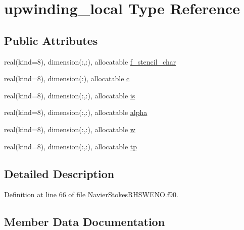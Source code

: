 \hypertarget{structnavierstokesrhsweno_1_1upwinding__local}{}\section{upwinding\+\_\+local Type Reference}
\label{structnavierstokesrhsweno_1_1upwinding__local}
\subsection*{Public Attributes}
\begin{DoxyCompactItemize}
\item 
real(kind=8), dimension(\+:,\+:), allocatable \hyperlink{structnavierstokesrhsweno_1_1upwinding__local_ae8ab145750afee96ec10369c19e7e70d}{f\+\_\+stencil\+\_\+char}
\item 
real(kind=8), dimension(\+:), allocatable \hyperlink{structnavierstokesrhsweno_1_1upwinding__local_ab13afebf281b06a3f8fd7e9583f8cab7}{c}
\item 
real(kind=8), dimension(\+:,\+:), allocatable \hyperlink{structnavierstokesrhsweno_1_1upwinding__local_ac5f36ae2f61ae9e930e966ab766c02db}{is}
\item 
real(kind=8), dimension(\+:,\+:), allocatable \hyperlink{structnavierstokesrhsweno_1_1upwinding__local_a142f37f8ffd42caa5964900c3e45b8ee}{alpha}
\item 
real(kind=8), dimension(\+:,\+:), allocatable \hyperlink{structnavierstokesrhsweno_1_1upwinding__local_a0828fbaa900a2324fd600b8ded289644}{w}
\item 
real(kind=8), dimension(\+:,\+:), allocatable \hyperlink{structnavierstokesrhsweno_1_1upwinding__local_a17b5c236c24dc2c39c875ab0c481d606}{tp}
\end{DoxyCompactItemize}


\subsection{Detailed Description}


Definition at line 66 of file Navier\+Stokes\+R\+H\+S\+W\+E\+N\+O.\+f90.



\subsection{Member Data Documentation}
\hypertarget{structnavierstokesrhsweno_1_1upwinding__local_a142f37f8ffd42caa5964900c3e45b8ee}{}\label{structnavierstokesrhsweno_1_1upwinding__local_a142f37f8ffd42caa5964900c3e45b8ee} 
